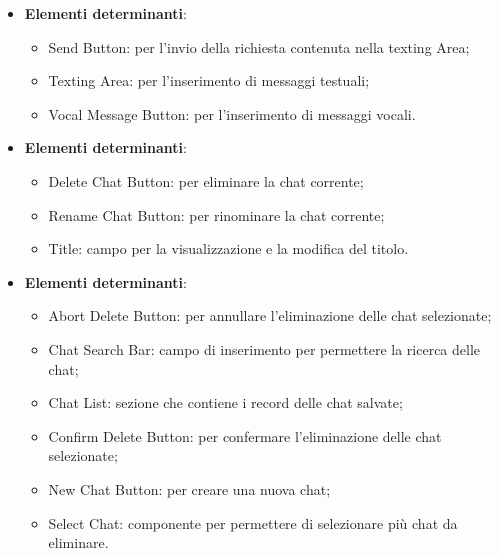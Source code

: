 \documentclass[10pt, a4paper]{article}
\begin{document}
\label{ChatFormDettaglio}
\begin{itemize}
    \item \textbf{Elementi determinanti}:
    \begin{itemize}
        \item Send Button: per l'invio della richiesta contenuta nella texting Area;
        \item Texting Area: per l'inserimento di messaggi testuali;
        \item Vocal Message Button: per l'inserimento di messaggi vocali.
    \end{itemize}
\end{itemize}


\label{ChatHeaderDettaglio}
\begin{itemize}
    \item \textbf{Elementi determinanti}:
    \begin{itemize}
        \item Delete Chat Button: per eliminare la chat corrente;
        \item Rename Chat Button: per rinominare la chat corrente;
        \item Title: campo per la visualizzazione e la modifica del titolo.
    \end{itemize}

\end{itemize}


\label{ChatListSideBarDettaglio}
\begin{itemize}
    \item \textbf{Elementi determinanti}:
    \begin{itemize}
        \item Abort Delete Button: per annullare l'eliminazione delle chat selezionate;
        \item Chat Search Bar: campo di inserimento per permettere la ricerca delle chat;
        \item Chat List: sezione che contiene i record delle chat salvate;
        \item Confirm Delete Button: per confermare l'eliminazione delle chat selezionate;
        \item New Chat Button: per creare una nuova chat;
        \item Select Chat: componente per permettere di selezionare più chat da eliminare.
    \end{itemize}
\end{itemize}
\end{document}
